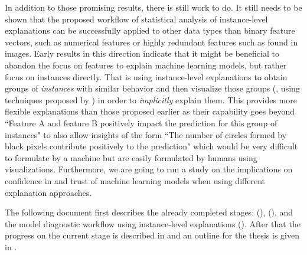 In addition to those promising results, there is still work to do.
It still needs to be shown that the proposed workflow of statistical analysis of instance-level explanations can be successfully applied to other data types than binary feature vectors, such as numerical features or highly redundant features such as found in images.
Early results in this direction indicate that it might be beneficial to abandon the focus on features to explain machine learning models, but rather focus on instances directly.
That is using instance-level explanations to obtain groups of \emph{instances} with similar behavior and then visualize those groups (\eg, using techniques proposed by \cite{seekaview}) in order to \emph{implicitly} explain them.
This provides more flexible explanations than those proposed earlier as their capability goes beyond ``Feature A and feature B positively impact the prediction for this group of instances" to also allow insights of the form ``The number of circles formed by black pixels contribute positively to the prediction" which would be very difficult to formulate by a machine but are easily formulated by humans using visualizations.
Furthermore, we are going to run a study on the implications on confidence in and trust of machine learning models when using different explanation approaches.

The following document first describes the already completed stages: \infuse (), \prospector (), and the model diagnostic workflow using instance-level explanations ().
After that the progress on the current stage is described in  and an outline for the thesis is given in .


